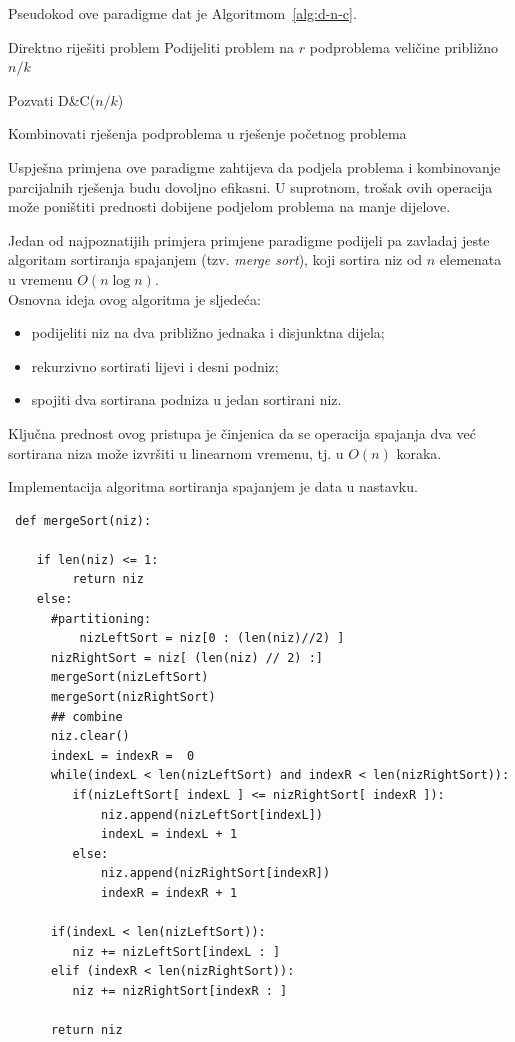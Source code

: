 Pseudokod ove paradigme dat je Algoritmom~\ref{alg:d-n-c}.

\begin{algorithm}
	\begin{algorithmic}[1]
		
		\State Direktno riješiti problem
		\Else
		\State Podijeliti problem na $r$ podproblema veličine približno $n/k$
		
		\State Pozvati \textsc{D\&C}($n/k$)
		\EndFor
		
		\State Kombinovati rješenja podproblema u rješenje početnog problema
		
		\EndIf
		
		\EndProcedure
	\end{algorithmic}
	\caption{Paradigma Podijeli pa zavladaj.}
	\label{alg:d-n-c}
\end{algorithm}

Uspješna primjena ove paradigme zahtijeva da podjela problema i kombinovanje parcijalnih rješenja budu dovoljno efikasni. U suprotnom, trošak ovih operacija može poništiti prednosti dobijene podjelom problema na manje dijelove.

Jedan od najpoznatijih primjera primjene paradigme podijeli pa zavladaj jeste algoritam sortiranja spajanjem (tzv. \emph{merge sort}), koji sortira niz od $n$ elemenata u vremenu $O(n \log n)$.\\ 

Osnovna ideja ovog algoritma je sljedeća:

\begin{itemize}
	\item podijeliti niz na dva približno jednaka i disjunktna dijela;
	\item rekurzivno sortirati lijevi i desni podniz;
	\item spojiti dva sortirana podniza u jedan sortirani niz.
\end{itemize}

Ključna prednost ovog pristupa je činjenica da se operacija spajanja dva već sortirana niza može izvršiti u linearnom vremenu, tj. u $O(n)$ koraka.


Implementacija algoritma  sortiranja spajanjem  je data u nastavku.
\begin{verbatim}
 def mergeSort(niz):  

    if len(niz) <= 1:    
         return niz
    else:
      #partitioning:
          nizLeftSort = niz[0 : (len(niz)//2) ]
	  nizRightSort = niz[ (len(niz) // 2) :] 
	  mergeSort(nizLeftSort) 
	  mergeSort(nizRightSort)
	  ## combine
	  niz.clear()
	  indexL = indexR =  0
	  while(indexL < len(nizLeftSort) and indexR < len(nizRightSort)):
	 	 if(nizLeftSort[ indexL ] <= nizRightSort[ indexR ]):
	 		 niz.append(nizLeftSort[indexL])
	 		 indexL = indexL + 1
	 	 else:
	 		 niz.append(nizRightSort[indexR])
	 		 indexR = indexR + 1
	 
	  if(indexL < len(nizLeftSort)):
	 	 niz += nizLeftSort[indexL : ] 
	  elif (indexR < len(nizRightSort)):
	 	 niz += nizRightSort[indexR : ]
	 
	  return niz

\end{verbatim}

